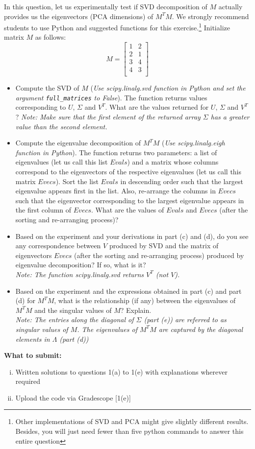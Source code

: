 In this question, let us experimentally test if SVD decomposition of $M$ actually provides us the eigenvectors (PCA dimensions) of $M^T M$. We strongly recommend students to use Python and suggested functions for this exercise.\footnote{Other implementations of SVD and PCA might give slightly different results. Besides, you will just need fewer than five python commands to answer this entire question} Initialize matrix $M$ as follows: 
\[ M =
\begin{bmatrix}
1 & 2\\
2 & 1\\
3 & 4\\
4 & 3\\
\end{bmatrix}
\] 
\begin{itemize}
\item Compute the SVD of $M$ (\emph{Use scipy.linalg.svd function in Python and set the argument \texttt{full\_matrices} to False}). The function returns values corresponding to $U$, $\Sigma$ and $V^T$. What are the values returned for $U$, $\Sigma$ and $V^T$?
\emph{Note: Make sure that the first element of the returned array $\Sigma$ has a greater value than the second element.}
\item Compute the eigenvalue decomposition of $M^T M$ (\emph{Use scipy.linalg.eigh function in Python}). The function returns two parameters: a list of eigenvalues (let us call this list $Evals$) and a matrix whose columns correspond to the eigenvectors of the respective eigenvalues (let us call this matrix $Evecs$). Sort the list $Evals$ in descending order such that the largest eigenvalue appears first in the list. Also, re-arrange the columns in $Evecs$ such that the eigenvector corresponding to the largest eigenvalue appears in the first column of $Evecs$. 
What are the values of $Evals$ and $Evecs$ (after the sorting and re-arranging process)?\\


\item Based on the experiment and your derivations in part (c) and (d), do you see any correspondence between $V$ produced by SVD and the matrix of eigenvectors $Evecs$ (after the sorting and re-arranging process) produced by eigenvalue decomposition? If so, what is it?\\
\emph{Note: The function scipy.linalg.svd returns $V^T$ (not $V$).}


\item Based on the experiment and the expressions obtained in part (c) and part (d) for $M^T M$, what is the relationship (if any) between the eigenvalues of $M^T M$ and the singular values of $M$? Explain. \\
\textit{Note: The entries along the diagonal of $\Sigma$ (part (e)) are referred to as singular values of $M$. The eigenvalues of $M^T M$ are captured by the diagonal elements in $\Lambda$ (part (d))}

\end{itemize}

{\bf What to submit:} 
\begin{enumerate}[(i)]
\item Written solutions to questions 1(a) to 1(e) with explanations wherever required
\item Upload the code via Gradescope [1(e)]
\end{enumerate}
